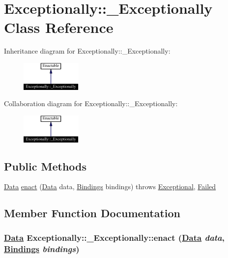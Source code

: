 \hypertarget{classExceptionally_1_1__Exceptionally}{
\section{Exceptionally::\_\-Exceptionally  Class Reference}
\label{classExceptionally_1_1__Exceptionally}
}
Inheritance diagram for Exceptionally::\_\-Exceptionally:\begin{figure}[H]
\begin{center}
\leavevmode
\includegraphics[width=84pt]{classExceptionally_1_1__Exceptionally__inherit__graph}
\end{center}
\end{figure}
Collaboration diagram for Exceptionally::\_\-Exceptionally:\begin{figure}[H]
\begin{center}
\leavevmode
\includegraphics[width=84pt]{classExceptionally_1_1__Exceptionally__coll__graph}
\end{center}
\end{figure}
\subsection*{Public Methods}
\begin{CompactItemize}
\item 
\hyperlink{interfaceData}{Data} \hyperlink{classExceptionally_1_1__Exceptionally_a0}{enact} (\hyperlink{interfaceData}{Data} data, \hyperlink{interfaceBindings}{Bindings} bindings) throws \hyperlink{classExceptional}{Exceptional}, \hyperlink{classFailed}{Failed}
\end{CompactItemize}


\subsection{Member Function Documentation}
\hypertarget{classExceptionally_1_1__Exceptionally_a0}{
\subsubsection[enact]{\setlength{\rightskip}{0pt plus 5cm}\hyperlink{interfaceData}{Data} Exceptionally::\_\-Exceptionally::enact (\hyperlink{interfaceData}{Data} {\em data}, \hyperlink{interfaceBindings}{Bindings} {\em bindings})}}
\label{classExceptionally_1_1__Exceptionally_a0}




